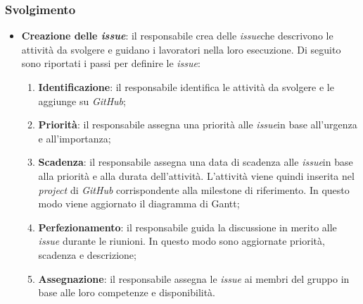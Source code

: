 \subsubsection{Svolgimento}
\begin{itemize}
	\item \textbf{Creazione delle \textit{issue\g}}: il responsabile crea
	      delle \textit{issue}\g che descrivono le attività da svolgere e guidano i
	      lavoratori nella loro esecuzione. Di seguito sono riportati i passi
	      per definire le \textit{issue\g}:
	      \begin{enumerate}
		      \item \textbf{Identificazione}: il responsabile identifica le
		            attività da svolgere e le aggiunge su \textit{GitHub\g};

		      \item \textbf{Priorità}: il responsabile assegna una priorità
		            alle \textit{issue}\g in base all'urgenza e all'importanza;

		      \item \textbf{Scadenza}: il responsabile assegna una data di
		            scadenza alle \textit{issue}\g in base alla priorità e alla durata
		            dell'attività. L'attività viene quindi inserita nel
		            \textit{project} di \textit{GitHub\g} corrispondente alla
		            milestone di riferimento. In questo modo viene aggiornato il
		            diagramma di Gantt;

		      \item \textbf{Perfezionamento}: il responsabile guida la
		            discussione in merito alle \textit{issue\g} durante le
		            riunioni. In questo modo sono aggiornate priorità,
		            scadenza e descrizione;

		      \item \textbf{Assegnazione}: il responsabile assegna le \textit{issue}\g
		            ai membri del gruppo in base alle loro competenze e
		            disponibilità.
	      \end{enumerate}
\end{itemize}
